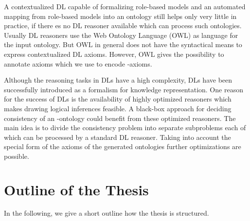 A contextualized DL capable of formalizing role-based models and an automated mapping from
role-based models into an ontology still helps only very little in practice, if there es no DL reasoner
available which can process such ontologies. 
%
Usually DL reasoners use the Web Ontology Language (OWL) as language for the input ontology. But OWL in
general does not have the syntactical means to express contextualized DL axioms. However, OWL gives
the possibility to annotate axioms which we use to encode \LMLO-axioms.

Although the reasoning tasks in DLs have a high complexity, DLs have been successfully introduced as
a formalism for knowledge representation. One reason for the success of DLs is the availability of
highly optimized reasoners which makes drawing logical inferences feasible. A black-box approach for
deciding consistency of an \LMLO-ontology could benefit from these optimized reasoners. The main
idea is to divide the consistency problem into separate subproblems each of which can be processed
by a standard DL reasoner.
%
Taking into account the special form of the axioms of the generated ontologies further optimizations
are possible.



\section{Outline of the Thesis}
\label{sec:outline-thesis}

In the following, we give a short outline how the thesis is structured.

